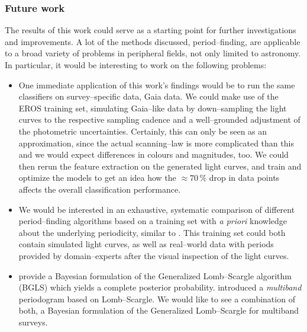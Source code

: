 
\subsubsection*{Future work}

The results of this work could serve as a starting point for further investigations and improvements. A lot of the methods discussed, \eg period--finding, are applicable to a broad variety of problems in peripheral fields, not only limited to astronomy. In particular, it would be interesting to work on the following problems:
\begin{itemize}

\item One immediate application of this work's findings would be to run the same classifiers on survey--specific data, \eg Gaia data. We could make use of the EROS training set, simulating Gaia--like data by down--sampling the light curves to the respective sampling cadence and a well--grounded adjustment of the photometric uncertainties. Certainly, this can only be seen as an approximation, since the actual scanning--law is more complicated than this and we would expect differences in colours and magnitudes, too. We could then rerun the feature extraction on the generated light curves, and train and optimize the models to get an idea how the $\approx 70 \, \%$ drop in data points affects the overall classification performance.

\item We would be interested in an exhaustive, systematic comparison of different period--finding algorithms based on a training set with \emph{a priori} knowledge about the underlying periodicity, similar to \citet{graham2013b}. This training set could both contain simulated light curves, as well as real--world data with periods provided by domain--experts after the visual inspection of the light curves.

\item \citet{mortier2015} provide a Bayesian formulation of the Generalized Lomb--Scargle algorithm (BGLS) which yields a complete posterior probability. \citet{vanderplas2015} introduced a \emph{multiband} periodogram based on Lomb--Scargle. We would like to see a combination of both, \ie a Bayesian formulation of the Generalized Lomb--Scargle for multiband surveys.

\end{itemize}
